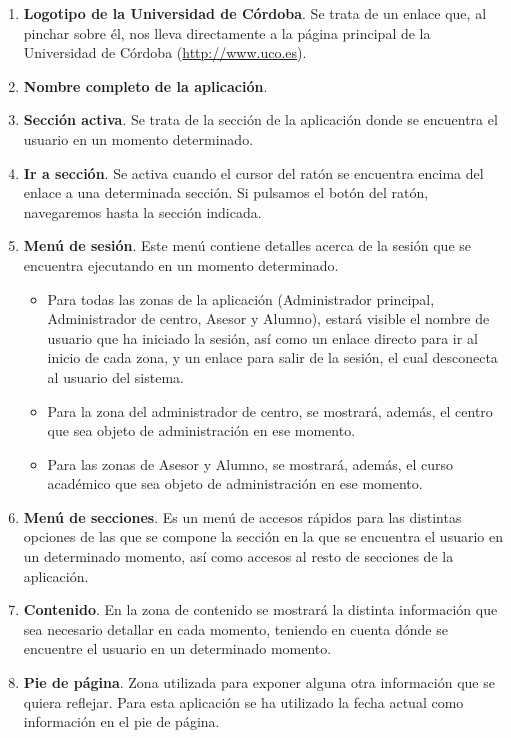   \begin{enumerate}
    \item \textbf{Logotipo de la Universidad de Córdoba}. Se trata de un
    enlace que, al pinchar sobre él, nos lleva directamente a la página
    principal de la Universidad de Córdoba (\url{http://www.uco.es}).
    \item \textbf{Nombre completo de la aplicación}.
    \item \textbf{Sección activa}. Se trata de la sección de la aplicación donde
    se encuentra el usuario en un momento determinado.
    \item \textbf{Ir a sección}. Se activa cuando el cursor del ratón se
    encuentra encima del enlace a una determinada sección. Si pulsamos el botón
    del ratón, navegaremos hasta la sección indicada.
    \item \textbf{Menú de sesión}. Este menú contiene detalles acerca de la
    sesión que se encuentra ejecutando en un momento determinado.
    \begin{itemize}
      \item Para todas las zonas de la aplicación (Administrador principal,
      Administrador de centro, Asesor y Alumno), estará visible el nombre de
      usuario que ha iniciado la sesión, así como un enlace directo para ir al
      inicio de cada zona, y un enlace para salir de la sesión, el cual
      desconecta al usuario del sistema.
      \item Para la zona del administrador de centro, se mostrará, además,
      el centro que sea objeto de administración en ese momento.
      \item Para las zonas de Asesor y Alumno, se mostrará, además, el curso
      académico que sea objeto de administración en ese momento.
    \end{itemize}

    \item \textbf{Menú de secciones}. Es un menú de accesos rápidos para las
    distintas opciones de las que se compone la sección en la que se encuentra
    el usuario en un determinado momento, así como accesos al resto de
    secciones de la aplicación.
    \item \textbf{Contenido}. En la zona de contenido se mostrará la distinta
    información que sea necesario detallar en cada momento, teniendo en cuenta
    dónde se encuentre el usuario en un determinado momento.
    \item \textbf{Pie de página}. Zona utilizada para exponer alguna otra
    información que se quiera reflejar. Para esta aplicación se ha utilizado
    la fecha actual como información en el pie de página.
  \end{enumerate}

  
  
  
  
